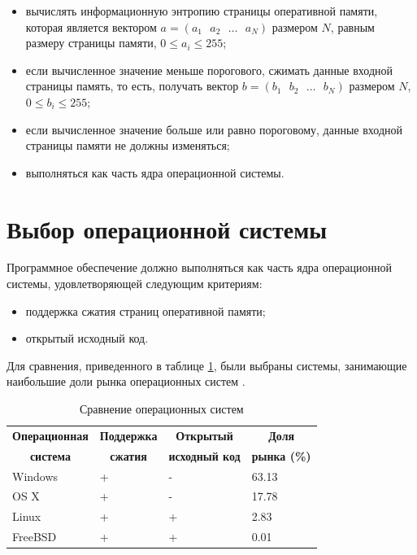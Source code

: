 \begin{itemize}
	\item вычислять информационную энтропию страницы оперативной памяти, которая является вектором $a = (a_1\text{ }a_2\text{ }\dotso\text{ }a_N)$ размером $N$, равным размеру страницы памяти, $0 \leq a_i \leq 255$;
	\item если вычисленное значение меньше порогового, сжимать данные входной страницы память, то есть, получать вектор $b = (b_1\text{ }b_2\text{ }\dotso\text{ }b_N)$ размером $N$, $0 \leq b_i \leq 255$;
	\item если вычисленное значение больше или равно пороговому, данные входной страницы памяти не должны изменяться;
    \item выполняться как часть ядра операционной системы.
\end{itemize}

\section{Выбор операционной системы}

Программное обеспечение должно выполняться как часть ядра операционной системы, удовлетворяющей следующим критериям:

\begin{itemize}
	\item поддержка сжатия страниц оперативной памяти;
	\item открытый исходный код.
\end{itemize}

Для сравнения, приведенного в таблице \ref{tab:comparison-os}, были выбраны системы, занимающие наибольшие доли рынка операционных систем \cite{stat}.

\begin{table}[h]
    \caption{Сравнение операционных систем}
    \begin{center}
        \begin{tabular}{|l|l|l|l|}
        		\hline
            \multicolumn{1}{|c}{\textbf{Операционная}} & 
            \multicolumn{1}{|c|}{\textbf{Поддержка}} &
            \multicolumn{1}{c|}{\textbf{Открытый}} &
            \multicolumn{1}{c|}{\textbf{Доля}} \\
            \multicolumn{1}{|c}{\textbf{система}} & 
            \multicolumn{1}{|c|}{\textbf{сжатия}} &
            \multicolumn{1}{c|}{\textbf{исходный код}} &
            \multicolumn{1}{c|}{\textbf{рынка (\%)}} \\ \hline
            Windows &  + & - & 63.13 \\ \hline
            OS X & + & - & 17.78 \\ \hline
            Linux & + & + & 2.83 \\ \hline
            FreeBSD & + & + & 0.01 \\ \hline
        \end{tabular}
    \end{center}
    \label{tab:comparison-os}
\end{table}

